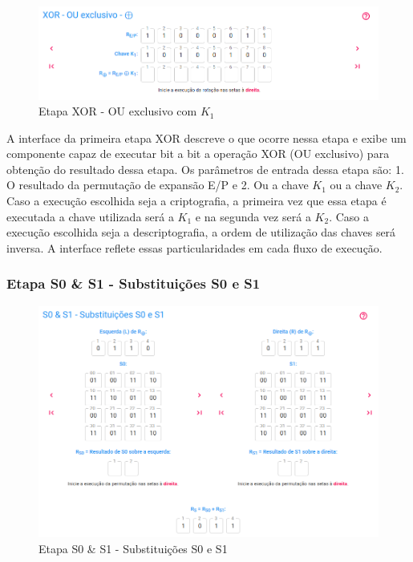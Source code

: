 \begin{figure}[H]
    \centering
    \caption{Etapa XOR - OU exclusivo com \(K_1\)}
    \includegraphics[width=1\linewidth]{UI/UIXORK1.png}
\end{figure}

A interface da primeira etapa XOR descreve o que ocorre nessa etapa e exibe um componente capaz de executar bit a bit a operação XOR (OU exclusivo) para obtenção do resultado dessa etapa. Os parâmetros de entrada dessa etapa são: 1. O resultado da permutação de expansão E/P e 2. Ou a chave \(K_1\) ou a chave \(K_2\). Caso a execução escolhida seja a criptografia, a primeira vez que essa etapa é executada a chave utilizada será a \(K_1\) e na segunda vez será a \(K_2\). Caso a execução escolhida seja a descriptografia, a ordem de utilização das chaves será inversa. A interface reflete essas particularidades em cada fluxo de execução.

\subsubsection{Etapa S0 \& S1 - Substituições S0 e S1}

\begin{figure}[H]
    \centering
    \caption{Etapa S0 \& S1 - Substituições S0 e S1}
    \includegraphics[width=1\linewidth]{UI/UIS0S1.png}
\end{figure}

